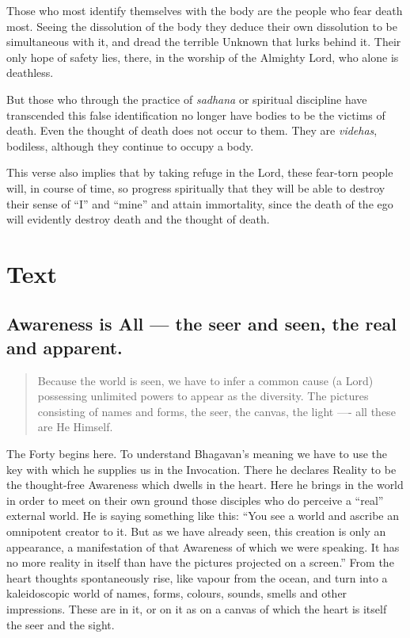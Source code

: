 \documentclass[12pt]{report}
\begin{document}
Those who most identify themselves with the body are the people who
fear death most. Seeing the dissolution of the body they deduce their
own dissolution to be simultaneous with it, and dread the terrible
Unknown that lurks behind it. Their only hope of safety lies, there,
in the worship of the Almighty Lord, who alone is deathless.

But those who through the practice of \emph{sadhana} or spiritual
discipline have transcended this false identification no longer have
bodies to be the victims of death. Even the thought of death does not
occur to them. They are \emph{videhas}, bodiless, although they
continue to occupy a body.

This verse also implies that by taking refuge in the Lord, these
fear-torn people will, in course of time, so progress spiritually that
they will be able to destroy their sense of ``I'' and ``mine'' and
attain immortality, since the death of the ego will evidently destroy
death and the thought of death.

\chapter{Text}


\section{ Awareness is All --- the seer and seen, the real and apparent.}

\begin{quote}
  Because the world is seen, we have to infer a common cause (a Lord)
  possessing unlimited powers to appear as the diversity. The pictures
  consisting of names and forms, the seer, the canvas, the light ----
  all these are He Himself.
\end{quote}


The Forty begins here. To understand Bhagavan's meaning we have to use
the key with which he supplies us in the Invocation. There he declares
Reality to be the thought-free Awareness which dwells in the
heart. Here he brings in the world in order to meet on their own
ground those disciples who do perceive a ``real'' external world. He
is saying something like this: ``You see a world and ascribe an
omnipotent creator to it. But as we have already seen, this creation
is only an appearance, a manifestation of that Awareness of which we
were speaking. It has no more reality in itself than have the pictures
projected on a screen.'' From the heart thoughts spontaneously rise,
like vapour from the ocean, and turn into a kaleidoscopic world of
names, forms, colours, sounds, smells and other impressions. These are
in it, or on it as on a canvas of which the heart is itself the seer
and the sight.
\end{document}
